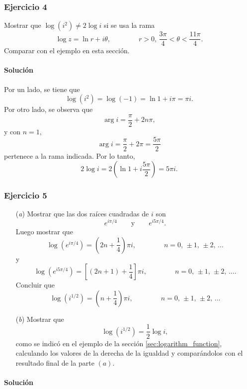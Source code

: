 \documentclass[a4paper]{report}
\begin{document}
\subsubsection{Ejercicio 4}

Mostrar que \(\log(i^2)\neq2\log i\) si se usa la rama
\[
 \log z=\ln r+i\theta,\qquad\qquad 
 r>0,\,\frac{3\pi}{4}<\theta<\frac{11\pi}{4}.
\]
Comparar con el ejemplo en esta sección.

\paragraph{Solución} Por un lado, se tiene que 
\[
 \log(i^2)=\log(-1)=\ln1+i\pi=\pi i.
\]
Por otro lado, se observa que
\[
 \arg i=\frac{\pi}{2}+2n\pi,
\]
y con \(n=1\),
\[
 \arg i=\frac{\pi}{2}+2\pi=\frac{5\pi}{2}
\]
pertenece a la rama indicada. Por lo tanto,
\[
 2\log i=2\left(\ln1+i\frac{5\pi}{2}\right)=5\pi i.
\]

\subsubsection{Ejercicio 5}

\begin{enumerate}
 \item[(\textit{a})] Mostrar que las dos raíces cuadradas de \(i\) son
 \[
  e^{i\pi/4}
  \qquad\textrm{y}\qquad
  e^{i5\pi/4}.
 \]
 Luego mostrar que 
 \[
  \log(e^{i\pi/4})=\left(2n+\frac{1}{4}\right)\pi i,\qquad\qquad n=0,\,\pm1,\,\pm2,\,\dots
 \]
 y
 \[
  \log(e^{i5\pi/4})=\left[(2n+1)+\frac{1}{4}\right]\pi i,\qquad\qquad n=0,\,\pm1,\,\pm2,\,\dots.
 \]
 Concluir que 
 \[
  \log(i^{1/2})=\left(n+\frac{1}{4}\right)\pi i,\qquad\qquad n=0,\,\pm1,\,\pm2,\,\dots
 \]
 \item[(\textit{b})] Mostrar que 
 \[
  \log(i^{1/2})=\frac{1}{2}\log i,
 \]
 como se indicó en el ejemplo de la sección \ref{sec:logarithm_function}, calculando los valores de la derecha de la igualdad y comparándolos con el resultado final de la parte \((a)\). 
\end{enumerate} 

\paragraph{Solución} 
\end{document}
